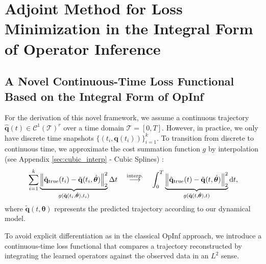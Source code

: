 \chapter{Adjoint Method for Loss Minimization in the Integral Form of Operator Inference}
\label{chap:methodology}



\section{A Novel Continuous-Time Loss Functional Based on the Integral Form of OpInf}

For the derivation of this novel framework, we assume a continuous trajectory $\hat{\mathbf{q}}(t) \in \mathcal{C}^1(\mathcal{T})^r$ over a time domain $\mathcal{T} = [0,T] $. However, in practice, we only have discrete time snapshots $\displaystyle\{ (t_i, \mathbf{q}(t_i)) \}_{i=1}^k$. To transition from discrete to continuous time, we approximate the cost summation function $g$ by interpolation (see Appendix \ref{sec:cubic_interp} - Cubic Splines) \cite{de1978practical}:\\
$$\sum_{i=1}^k \underbrace{\norm{\hat{\mathbf{q}}_\text{true}(t_i)-\tilde{\mathbf{q}}(t_i,\hat{\bm\theta})}_2^2}_{g(\tilde{\mathbf{q}}(t_i,\hat{\bm\theta}),t_i)}\Delta t 
\quad \overset{\text{interp.}}{\longrightarrow} \quad  
\int_0^T \underbrace{\norm{\hat{\mathbf{q}}_\text{true}(t)-\tilde{\mathbf{q}}(t,\hat{\bm\theta})}_2^2}_{g(\tilde{\mathbf{q}}(t,\hat{\bm\theta}),t)} \dd t,
$$
where $\tilde{\mathbf{q}}(t,\bm\theta)$ represents the predicted trajectory according to our dynamical model.

To avoid explicit differentiation as in the classical OpInf approach, we introduce a continuous-time loss functional that compares a trajectory reconstructed by integrating the learned operators against the observed data in an $L^2$ sense.

